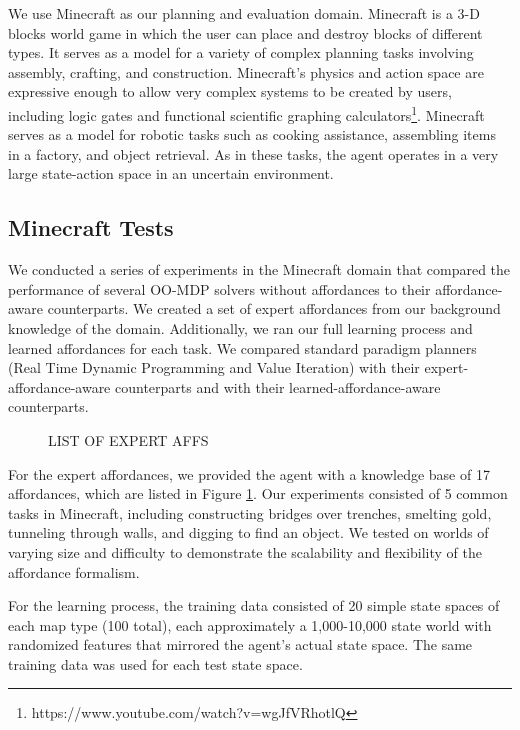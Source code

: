 \documentclass[conference]{IEEEtran}
\begin{document}
We use Minecraft as our planning and evaluation domain. Minecraft is a
 3-D blocks world game in which the user can place and destroy blocks
 of different types. It serves as a model for a variety of complex planning tasks involving 
 assembly, crafting, and construction.  Minecraft's physics and action space are expressive
 enough to allow very complex systems to be created by users, including logic gates and 
 functional scientific graphing calculators\footnote{https://www.youtube.com/watch?v=wgJfVRhotlQ}.
 Minecraft serves as a model for robotic tasks such as cooking assistance, assembling items in a factory, 
 and object retrieval.  As in these tasks, the agent operates in a very large state-action space in an uncertain environment.

\subsection{Minecraft Tests}
We conducted a series of experiments in the Minecraft domain that
compared the performance of several OO-MDP solvers without affordances
to their affordance-aware counterparts. We created a set of expert
affordances from our background knowledge of the domain. Additionally, we ran our full
learning process and learned affordances for each
task. We compared standard paradigm planners (Real Time Dynamic
Programming and Value Iteration) with their expert-affordance-aware
counterparts and with their learned-affordance-aware counterparts.

\begin{figure}
LIST OF EXPERT AFFS
\label{fig:afford_kb_exp}
\end{figure}

For the expert affordances, we provided the agent with a knowledge base of 17 affordances,
which are listed in Figure \ref{fig:afford_kb_exp}.  Our experiments
consisted of 5 common tasks in Minecraft, including
constructing bridges over trenches, smelting gold, tunneling
through walls, and digging to find an object.  We tested on worlds of varying size
and difficulty to demonstrate the scalability and flexibility of the
affordance formalism.

For the learning process, the training data consisted of 20 simple state
spaces of each map type (100 total), each approximately a 1,000-10,000 state world with randomized features that mirrored the agent's actual state space. The same training data was used
for each test state space.
\end{document}
